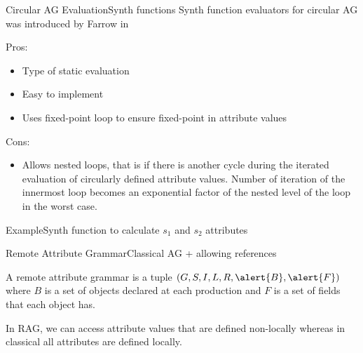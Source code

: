 \begin{frame}{Circular AG Evaluation}{Synth functions}
\alert{Synth function evaluators} for circular AG was introduced by Farrow in \cite{10.1145/13310.13320}

\newlinevspace

{ \footnotesize 

Pros:
\begin{itemize}
    \item Type of \alert{static evaluation}
    \item Easy to implement
    \item Uses \alert{fixed-point loop} to ensure fixed-point in attribute values
\end{itemize}

Cons:
\begin{itemize}
    \item Allows \alert{nested loops}, that is if there is another cycle during the iterated evaluation of circularly defined attribute values. Number of iteration of the innermost loop becomes an \alert{exponential factor} of the nested level of the loop in the worst case.
\end{itemize} }

\end{frame}


\begin{frame}{Example}{Synth function to calculate $s_1$ and $s_2$ attributes}

\begin{minipage}{0.8\linewidth}
\scriptsize
\begin{algorithmic}
        \State {}
        \State {}
    \EndIf
\EndFunction
\State
{}
        \State {}
        \State {}
    \EndIf
\EndFunction
\end{algorithmic}
\end{minipage}

\end{frame}


\begin{frame}{Remote Attribute Grammar}{Classical AG + allowing references}
\begin{definition}
A remote attribute grammar is a tuple $(G,S,I,L,R,\alert{B},\alert{F})$ where \alert{$B$ is a set of objects} declared at each production and \alert{$F$ is a set of fields} that each object has.
\end{definition}

\newlinevspace

In RAG, we can access attribute values that are defined \alert{non-locally} whereas in classical all attributes are defined \alert{locally}.

\end{frame}



